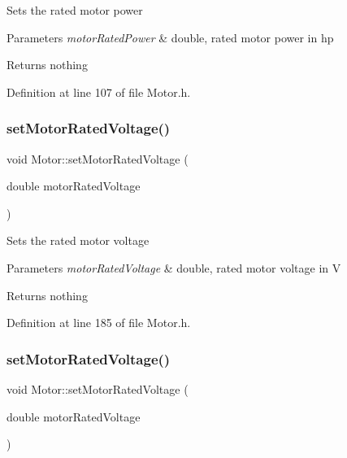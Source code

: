 Sets the rated motor power


\begin{DoxyParams}{Parameters}
{\em motor\+Rated\+Power} & double, rated motor power in hp\\
\hline
\end{DoxyParams}
\begin{DoxyReturn}{Returns}
nothing 
\end{DoxyReturn}


Definition at line 107 of file Motor.\+h.

\mbox{\label{class_motor_aab754019236e34cba0acd3632567515e}} 
\subsubsection{\texorpdfstring{set\+Motor\+Rated\+Voltage()}{setMotorRatedVoltage()}\hspace{0.1cm}{\footnotesize\ttfamily [1/3]}}
{\footnotesize\ttfamily void Motor\+::set\+Motor\+Rated\+Voltage (\begin{DoxyParamCaption}\item[{double}]{motor\+Rated\+Voltage }\end{DoxyParamCaption})\hspace{0.3cm}{\ttfamily [inline]}}

Sets the rated motor voltage


\begin{DoxyParams}{Parameters}
{\em motor\+Rated\+Voltage} & double, rated motor voltage in V\\
\hline
\end{DoxyParams}
\begin{DoxyReturn}{Returns}
nothing 
\end{DoxyReturn}


Definition at line 185 of file Motor.\+h.

\mbox{\label{class_motor_aab754019236e34cba0acd3632567515e}} 
\subsubsection{\texorpdfstring{set\+Motor\+Rated\+Voltage()}{setMotorRatedVoltage()}\hspace{0.1cm}{\footnotesize\ttfamily [2/3]}}
{\footnotesize\ttfamily void Motor\+::set\+Motor\+Rated\+Voltage (\begin{DoxyParamCaption}\item[{double}]{motor\+Rated\+Voltage }\end{DoxyParamCaption})\hspace{0.3cm}{\ttfamily [inline]}}

